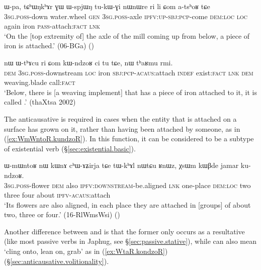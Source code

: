 \begin{exe}
\ex \label{ex:Com.atshoR}
 \gll ɯ-pa, tɕʰɯŋkʰɤr ɣɯ ɯ-spjɯŋ tu-kɯ-ɣi nɯnɯre ri li ɕom a-tsʰoʁ tɕe \\
  \textsc{3sg}.\textsc{poss}-down water.wheel \textsc{gen} \textsc{3sg}.\textsc{poss}-axle \textsc{ipfv}:\textsc{up}-\textsc{sbj}:\textsc{pcp}-come \textsc{dem}:\textsc{loc} \textsc{loc} again iron \textsc{pass}-attach:\textsc{fact} \textsc{lnk} \\
\glt `On the [top extremity of] the axle of the mill coming up from below, a piece of iron is attached.' (06-BGa) 	()
\end{exe}

\begin{exe}
\ex \label{ex:Com.kWndzoR}
 \gll nɯ ɯ-tʰɤcu ri ɕom kɯ-ndzoʁ ci tu tɕe, nɯ tʰaʁmu rmi. \\
 \textsc{dem} \textsc{3sg}.\textsc{poss}-downstream \textsc{loc} iron \textsc{sbj}:\textsc{pcp}-\textsc{acaus}:attach \textsc{indef} exist:\textsc{fact} \textsc{lnk} \textsc{dem} weaving.blade call:\textsc{fact} \\
 \glt `Below, there is [a weaving implement] that has a piece of iron attached to it, it is called .' (thaXtsa 2002)
\end{exe}

The anticausative  is required in cases when the entity that is attached on a surface has grown on it, rather than having been attached by someone, as in (\ref{ex:WmWntoR.kundzoR}). In this function, it can be considered to be a subtype of existential verb (§\ref{sec:existential.basic}).

\begin{exe}
\ex \label{ex:WmWntoR.kundzoR}
 \gll ɯ-mɯntoʁ nɯ kɯnɤ cʰɯ-ɤʑirja tɕe tɯ-kʰɤl nɯtɕu ʁnɯz, χsɯm kɯβde jamar ku-ndzoʁ. \\
 \textsc{3sg}.\textsc{poss}-flower \textsc{dem} also \textsc{ipfv}:\textsc{downstream}-be.aligned \textsc{lnk} one-place \textsc{dem}:\textsc{loc} two three four about \textsc{ipfv}-\textsc{acaus}:attach \\
 \glt `Its flowers are also aligned, in each place they are attached in [groups] of about two, three or four.' (16-RlWmsWsi)
()
\end{exe}

Another difference between  and  is that the former only occurs as a resultative (like most passive verbs in Japhug, see §\ref{sec:passive.stative}), while  can also mean `cling onto, lean on, grab' as in (\ref{ex:WtaR.kondzoR}) (§\ref{sec:anticausative.volitionality}).

